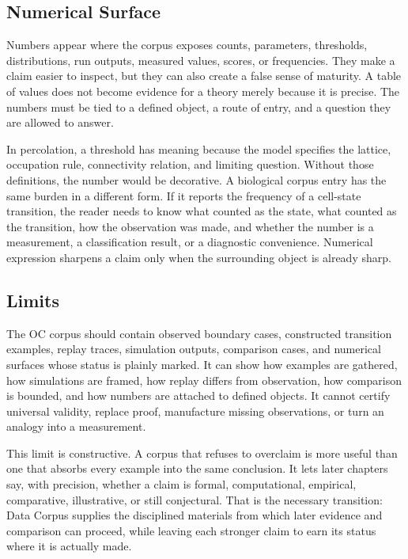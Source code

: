 \documentclass[11pt,a4paper,openany]{book}
\begin{document}
\subsection{Numerical Surface}
Numbers appear where the corpus exposes counts, parameters, thresholds, distributions, run outputs, measured values, scores, or frequencies. They make a claim easier to inspect, but they can also create a false sense of maturity. A table of values does not become evidence for a theory merely because it is precise. The numbers must be tied to a defined object, a route of entry, and a question they are allowed to answer. \cite{stauffer_percolation,grimmett_percolation}\par
In percolation, a threshold has meaning because the model specifies the lattice, occupation rule, connectivity relation, and limiting question. Without those definitions, the number would be decorative. A biological corpus entry has the same burden in a different form. If it reports the frequency of a cell-state transition, the reader needs to know what counted as the state, what counted as the transition, how the observation was made, and whether the number is a measurement, a classification result, or a diagnostic convenience. Numerical expression sharpens a claim only when the surrounding object is already sharp.\par
\subsection{Limits}
The OC corpus should contain observed boundary cases, constructed transition examples, replay traces, simulation outputs, comparison cases, and numerical surfaces whose status is plainly marked. It can show how examples are gathered, how simulations are framed, how replay differs from observation, how comparison is bounded, and how numbers are attached to defined objects. It cannot certify universal validity, replace proof, manufacture missing observations, or turn an analogy into a measurement. \cite{stauffer_percolation,grimmett_percolation}\par
This limit is constructive. A corpus that refuses to overclaim is more useful than one that absorbs every example into the same conclusion. It lets later chapters say, with precision, whether a claim is formal, computational, empirical, comparative, illustrative, or still conjectural. That is the necessary transition: Data Corpus supplies the disciplined materials from which later evidence and comparison can proceed, while leaving each stronger claim to earn its status where it is actually made.\par
\end{document}
